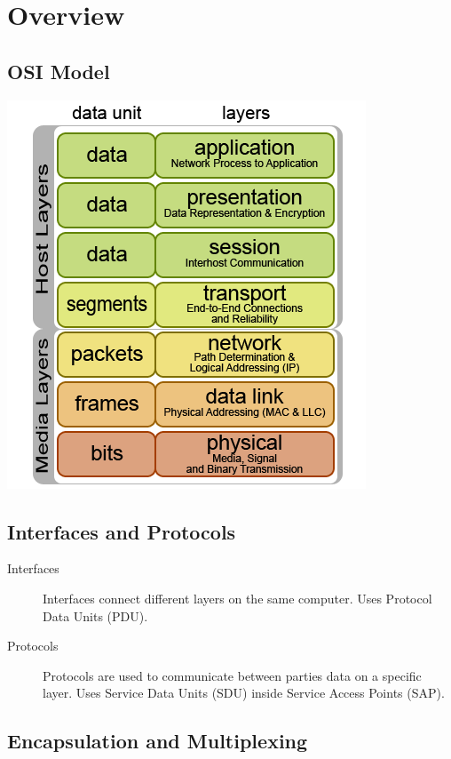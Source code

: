 \documentclass{article}
\begin{document}
\newpage

\section{Overview}


\subsection{OSI Model}

\begin{center}
\includegraphics[scale=0.7]{images/OSI-model.png}\\[1cm]
\end{center}


\subsection{Interfaces and Protocols}

\begin{description}
	\item[Interfaces] Interfaces connect different layers on the same computer. Uses Protocol Data Units (PDU).
	\item[Protocols] Protocols are used to communicate between parties data on a specific layer. Uses Service Data Units (SDU) inside Service Access Points (SAP).
\end{description}


\subsection{Encapsulation and Multiplexing}
\end{document}
